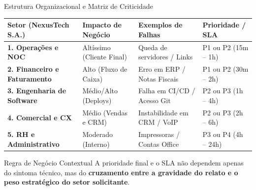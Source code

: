 \documentclass[aspectratio=169, 10pt]{beamer}
\begin{document}
\begin{frame}{Estrutura Organizacional e Matriz de Criticidade}
    \begin{table}[h]
        \centering
        \footnotesize
        \begin{tabular}{llll}
            \toprule
            \textbf{Setor (NexusTech S.A.)} & \textbf{Impacto de Negócio} & \textbf{Exemplos de Falhas} & \textbf{Prioridade / SLA} \\
            \midrule
            \textbf{1. Operações e NOC} & Altíssimo (Cliente Final) & Queda de servidores / Links & P1 ou P2 (15m -- 1h) \\
            \textbf{2. Financeiro e Faturamento} & Alto (Fluxo de Caixa) & Erro em ERP / Notas Fiscais & P1 ou P2 (30m -- 2h) \\
            \textbf{3. Engenharia de Software} & Médio/Alto (Deploys) & Falha em CI/CD / Acesso Git & P2 ou P3 (1h -- 4h) \\
            \textbf{4. Comercial e CX} & Médio (Vendas e CRM) & Instabilidade em CRM / VoIP & P2 ou P3 (2h -- 6h) \\
            \textbf{5. RH e Administrativo} & Moderado (Interno) & Impressoras / Contas Office & P3 ou P4 (4h -- 24h) \\
            \bottomrule
        \end{tabular}
    \end{table}

    \vspace{0.2cm}
    \begin{block}{Regra de Negócio Contextual}
        A prioridade final e o SLA não dependem apenas do sintoma técnico, mas do \textbf{cruzamento entre a gravidade do relato e o peso estratégico do setor solicitante}.
    \end{block}
\end{frame}
\end{document}
